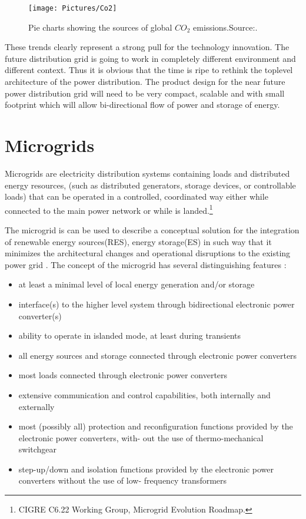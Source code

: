 \documentclass[]{scrartcl}
\newenvironment{definition}[1][Definition]{\begin{trivlist}
		\item[\hskip \labelsep {\bfseries #1}]}{\end{trivlist}}
\begin{document}
\begin{figure}[h!]
\centering
\texttt{[image: Pictures/Co2]}
\caption{Pie charts showing the sources of global $CO_2$ emissions.Source:\cite{Allwood2012}.}
\label{fig:co2}
\end{figure}


These trends clearly represent a strong pull for the technology innovation. The future distribution grid is going to work in completely different environment and different context. Thus it is obvious that the time is ripe to rethink the toplevel architecture of the power distribution. The product design for the near future power distribution grid will need to be very compact, scalable and with small footprint\cite{Garrity2009} which will allow bi-directional flow of power and storage of energy.




\newpage
\section{Microgrids}

\begin{definition}
	Microgrids are electricity distribution systems containing loads and distributed energy resources, (such as distributed generators, storage devices, or controllable loads) that can be operated in a controlled, coordinated way either while connected to the main power network or while is landed.\footnote{CIGRE C6.22 Working Group, Microgrid Evolution Roadmap.}\cite{Marnay2015}
\end{definition}


The microgrid is can be used to describe a conceptual solution for the integration of renewable energy sources(RES), energy storage(ES) in such way that it minimizes the architectural changes and operational disruptions to the existing power grid \cite{Lasseter2004}. The concept of the microgrid has several distinguishing features \cite{Boroyevich2013}:
\begin{itemize}
	\item at least a minimal level of local energy generation and/or storage
	\item interface(s) to the higher level system through bidirectional electronic power converter(s)
	\item ability to operate in islanded mode, at least during transients
	\item all energy sources and storage connected through electronic power converters
	\item most loads connected through electronic power converters
	\item extensive communication and control capabilities, both internally and externally
	\item most (possibly all) protection and reconfiguration functions provided by the electronic power converters, with- out the use of thermo-mechanical switchgear
	\item step-up/down and isolation functions provided by the electronic power converters without the use of low- frequency transformers
\end{itemize}
\end{document}
